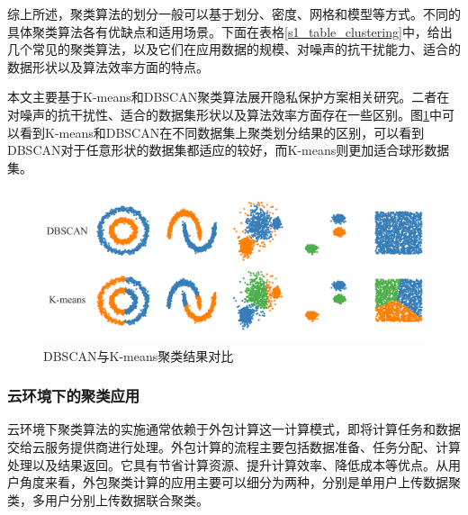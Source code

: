 综上所述，聚类算法的划分一般可以基于划分、密度、网格和模型等方式。不同的具体聚类算法各有优缺点和适用场景。下面在表格\ref{s1_table_clustering}中，给出几个常见的聚类算法，以及它们在应用数据的规模、对噪声的抗干扰能力、适合的数据形状以及算法效率方面的特点。
\begin{table}[htbp]
	\centering
	\renewcommand{\arraystretch}{1.3}
	\caption{常见聚类算法比较}
	\label{s1_table_clustering}
\end{table}

本文主要基于K-means和DBSCAN聚类算法展开隐私保护方案相关研究。二者在对噪声的抗干扰性、适合的数据集形状以及算法效率方面存在一些区别。图\ref{clu_difference}中可以看到K-means和DBSCAN在不同数据集上聚类划分结果的区别，可以看到DBSCAN对于任意形状的数据集都适应的较好，而K-means则更加适合球形数据集。

\begin{figure}[htbp]
	\centering
	\includegraphics[width=\linewidth]{img/difference.png}
	\caption{DBSCAN与K-means聚类结果对比}
	\label{clu_difference}
\end{figure}

\subsubsection{云环境下的聚类应用}
\label{juleiyanjiu}
云环境下聚类算法的实施通常依赖于外包计算这一计算模式，即将计算任务和数据交给云服务提供商进行处理。外包计算的流程主要包括数据准备、任务分配、计算处理以及结果返回。它具有节省计算资源、提升计算效率、降低成本等优点。从用户角度来看，外包聚类计算的应用主要可以细分为两种，分别是单用户上传数据聚类，多用户分别上传数据联合聚类。

